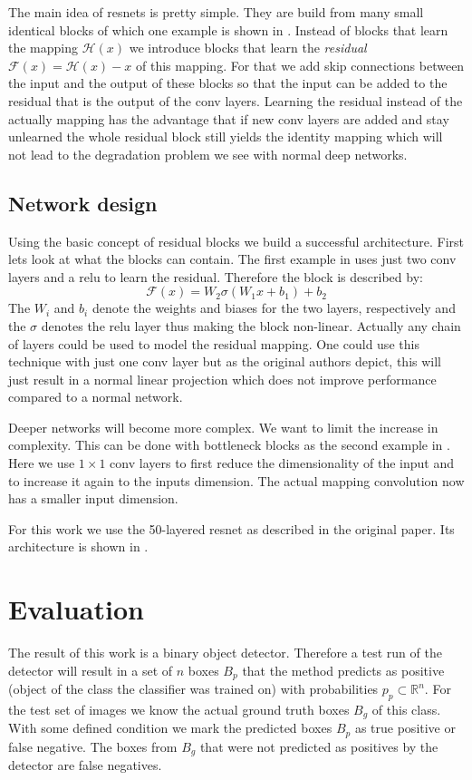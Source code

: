 The main idea of \glspl{resnet} is pretty simple. They are build from many small identical blocks of which one example is shown in . Instead of blocks that learn the mapping $\mathcal{H}(x)$ we introduce blocks that learn the \textit{residual} $\mathcal{F}(x) = \mathcal{H}(x) - x$ of this mapping. For that we add skip connections between the input and the output of these blocks so that the input can be added to the residual that is the output of the \gls{conv} layers. Learning the residual instead of the actually mapping has the advantage that if new \gls{conv} layers are added and stay unlearned the whole residual block still yields the identity mapping which will not lead to the degradation problem we see with normal deep networks.

\subsection{Network design}
\label{sec:concepts:resnet:design}
Using the basic concept of residual blocks we build a successful architecture. First lets look at what the blocks can contain. The first example in  uses just two \gls{conv} layers and a \gls{relu} to learn the residual. Therefore the block is described by:
\begin{equation}
    \mathcal{F}(x) = W_2\sigma(W_1 x + b_1) + b_2
\end{equation}
The $W_i$ and $b_i$ denote the weights and biases for the two layers, respectively and the $\sigma$ denotes the \gls{relu} layer thus making the block non-linear. Actually any chain of layers could be used to model the residual mapping. One could use this technique with just one \gls{conv} layer but as the original authors \citep{he_deep_2016} depict, this will just result in a normal linear projection which does not improve performance compared to a normal network.

Deeper networks will become more complex. We want to limit the increase in complexity. This can be done with bottleneck blocks as the second example in . Here we use $1\times1$ \gls{conv} layers to first reduce the dimensionality of the input and to increase it again to the inputs dimension. The actual mapping convolution now has a smaller input dimension.

For this work we use the 50-layered \gls{resnet} as described in the original paper. Its architecture is shown in .

\section{Evaluation}
\label{sec:concepts:eval}
The result of this work is a binary object detector. Therefore a test run of the detector will result in a set of $n$ boxes $B_p$ that the method predicts as positive (object of the class the classifier was trained on) with probabilities $p_p \subset \mathbb{R}^n$. For the test set of images we know the actual ground truth boxes $B_g$ of this class. With some defined condition we mark the predicted boxes $B_p$ as true positive or false negative. The boxes from $B_g$ that were not predicted as positives by the detector are false negatives.

